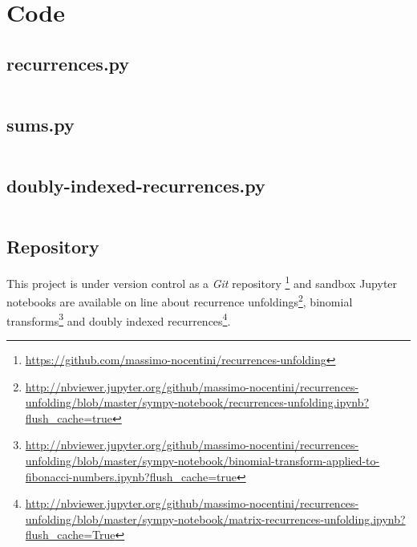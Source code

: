 
\chapter{Code}

\section{recurrences.py}
\begin{adjustwidth}{-4cm}{0cm}
    \inputminted{python}{../src/recurrences.py}
\end{adjustwidth}

\section{sums.py}

\begin{adjustwidth}{-4cm}{0cm}
    \inputminted{python}{../src/sums.py}
\end{adjustwidth}

\section{doubly-indexed-recurrences.py}

\begin{adjustwidth}{-4cm}{0cm}
    \inputminted{python}{../src/doubly-indexed-recurrences.py}
\end{adjustwidth}

\section{Repository}

This project is under version control as a \emph{Git} repository
\footnote{\url{https://github.com/massimo-nocentini/recurrences-unfolding}}
and sandbox Jupyter notebooks are available on line about recurrence
unfoldings\footnote{\url{http://nbviewer.jupyter.org/github/massimo-nocentini/recurrences-unfolding/blob/master/sympy-notebook/recurrences-unfolding.ipynb?flush_cache=true}},
binomial transforms\footnote{\url{http://nbviewer.jupyter.org/github/massimo-nocentini/recurrences-unfolding/blob/master/sympy-notebook/binomial-transform-applied-to-fibonacci-numbers.ipynb?flush_cache=true}}
and doubly indexed recurrences\footnote{\url{http://nbviewer.jupyter.org/github/massimo-nocentini/recurrences-unfolding/blob/master/sympy-notebook/matrix-recurrences-unfolding.ipynb?flush_cache=True}}.

